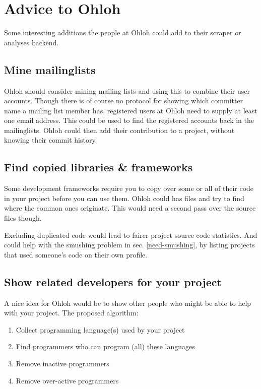 \documentclass{sig-alternate}
\begin{document}
\section{Advice to Ohloh}
Some interesting additions the people at Ohloh could add to their scraper or analyses backend.


\subsection{Mine mailinglists}\label{sec:mine-ml}

Ohloh should consider mining mailing lists and using this to combine their user accounts. Though there is of course no protocol for showing which committer name a mailing list member has, registered users at Ohloh need to supply at least one email address. This could be used to find the registered accounts back in the mailinglists. Ohloh could then add their contribution to a project, without knowing their commit history.


\subsection{Find copied libraries \& frameworks}
Some development frameworks require you to copy over some or all of their code in your project before you can use them. Ohloh could has files and try to find where the common ones originate. This would need a second pass over the source files though.

Excluding duplicated code would lead to fairer project source code statistics. And could help with the smushing problem in sec. \ref{need-smushing}, by listing projects that used someone's code on their own profile.


\subsection{Show related developers for your project}\label{related-devs}

A nice idea for Ohloh would be to show other people who might be able to help with your project. The proposed algorithm:

\begin{enumerate}
  \item Collect programming language(s) used by your project
  \item Find programmers who can program (all) these languages
  \item Remove inactive programmers
  \item Remove over-active programmers
\end{enumerate}
\end{document}
